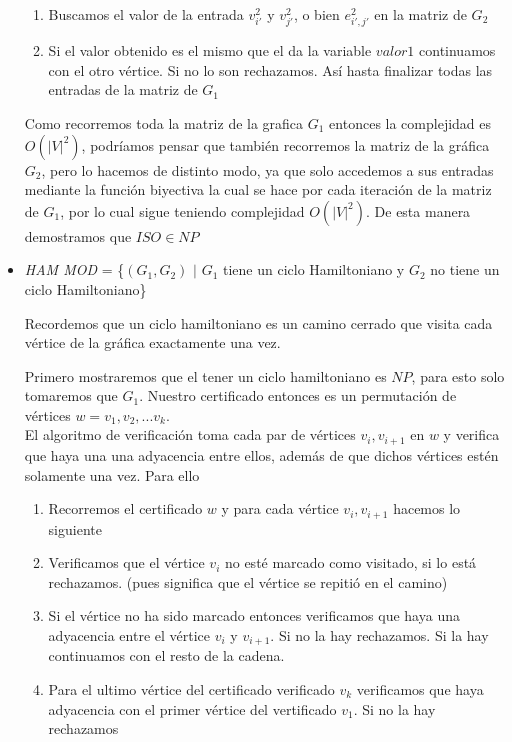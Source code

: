 \documentclass[12pt,letterpaper]{article}
\begin{document}
\begin{itemize}
\begin{enumerate}
    \item Buscamos el valor de la entrada $v_{i'}^2$ y $v_{j'}^2$, o bien $e_{i',j'}^2$ en la matriz de $G_2$
    
    \item Si el valor obtenido es el mismo que el da la variable $valor1$ continuamos con el otro vértice. Si no lo son rechazamos. Así hasta finalizar todas las entradas de la matriz de $G_1$
    \end{enumerate}
    
    Como recorremos toda la matriz de la grafica $G_1$ entonces la complejidad es $O(|V|^2)$, podríamos pensar que también recorremos la matriz de la gráfica $G_2$, pero lo hacemos de distinto modo, ya que solo accedemos a sus entradas mediante la función biyectiva la cual se hace por cada iteración de la matriz de $G_1$, por lo cual sigue teniendo complejidad $O(|V|^2)$. De esta manera demostramos que $ISO \in NP$

    \item \textit{HAM MOD} = \{$(G_1, G_2)$ $|$ $G_1$ tiene un ciclo Hamiltoniano y $G_2$ no tiene un ciclo Hamiltoniano\}
    
    Recordemos que un ciclo hamiltoniano es un camino cerrado que visita cada vértice de la gráfica exactamente una vez.

    Primero mostraremos que el tener un ciclo hamiltoniano es $NP$, para esto solo tomaremos que $G_1$.
    Nuestro certificado entonces es un permutación de vértices $w = v_1, v_2, ... v_k$.\\
    El algoritmo de verificación toma cada par de vértices $v_i, v_{i+1}$ en $w$ y verifica que haya una una adyacencia entre ellos, además de que dichos vértices estén solamente una vez. Para ello
    \begin{enumerate}
        \item Recorremos el certificado $w$ y para cada vértice $v_i, v_{i+1}$ hacemos lo siguiente
        
        \item Verificamos que el vértice $v_i$ no esté marcado como visitado, si lo está rechazamos. (pues significa que el vértice se repitió en el camino) 
        
        \item Si el vértice no ha sido marcado entonces verificamos que haya una adyacencia entre el vértice $v_i$ y $v_{i+1}$. Si no la hay rechazamos. Si la hay continuamos con el resto de la cadena.
        
        \item Para el ultimo vértice del certificado verificado $v_k$ verificamos que haya adyacencia con el primer vértice del vertificado $v_1$. Si no la hay rechazamos
        

\end{enumerate}
\end{itemize}
\end{document}
